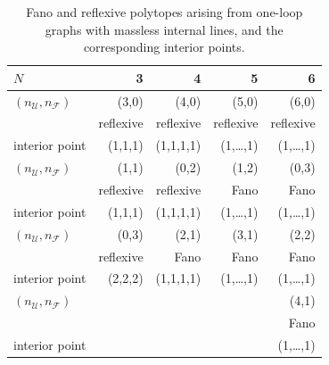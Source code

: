 \documentclass[12pt,a4paper]{article}
\theoremstyle{plain}
\theoremstyle{remark}
\newcommand{\cU}{\mathscr {U}}
\newcommand{\cF}{\mathscr {F}}
\begin{document}
	\begin{table}[tb]
			\centering
			\setlength{\tabcolsep}{1em}
			\begin{tabular}{@{}l|r|r|r|r|@{}}
				$N$   & 3 & 4 & 5 &6 \\
                          \hline
                          		$(n_\cU,n_\cF)$
                                      &(3,0) & (4,0)&(5,0) &(6,0)\\
                          &reflexive & reflexive&reflexive
                                                  &reflexive\\
                       interior point   &(1,1,1) & (1,1,1,1)&(1,\dots,1)
                                                  &(1,\dots,1)\\
                          \hline
				$(n_\cU,n_\cF)$  &(1,1) & (0,2)&(1,2)
                                                  &(0,3)\\
                                                     &reflexive & reflexive&Fano
                                                  &Fano\\
                          interior point    &(1,1,1) & (1,1,1,1)&(1,\dots,1)
                                                  &(1,\dots,1)\\
                          \hline
                          				$(n_\cU,n_\cF)$
                                      &(0,3) & (2,1)&(3,1) &(2,2)\\
                          &reflexive & Fano&Fano
                                                  &Fano\\
                         interior point   &(2,2,2) & (1,1,1,1)&(1,\dots,1)
                                                  &(1,\dots,1)\\
                          \hline
                          
                              	$(n_\cU,n_\cF)$         &&&&(4,1)\\
                          
                          & & &
                                                  &Fano\\
                       interior point     & & &
                                                  &(1,\dots,1)\\
                          \hline
                          					\end{tabular}
			\caption{Fano and reflexive polytopes arising from one-loop graphs with massless internal lines, and the corresponding interior points.}
			\label{tab:oneloopmassless}
		\end{table} 
\end{document}
